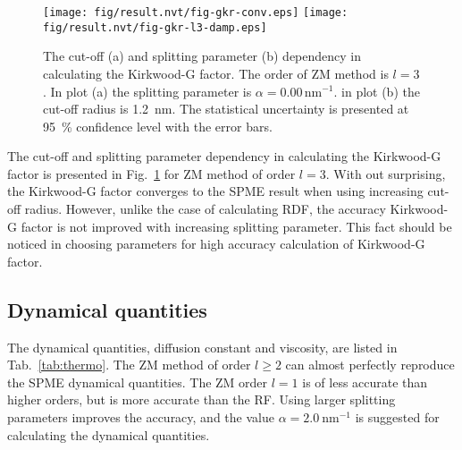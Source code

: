 \documentclass[aip,jcp,a4paper,preprint,unsortedaddress,onecolumn,fleqn]{revtex4-1}
\begin{document}
\begin{figure}
  \centering
  \texttt{[image: fig/result.nvt/fig-gkr-conv.eps]}
  \texttt{[image: fig/result.nvt/fig-gkr-l3-damp.eps]} 
  \caption{
    The cut-off (a) and splitting parameter (b) dependency in calculating the Kirkwood-G factor.
    The order of ZM method is $l=3$. In plot (a) the splitting parameter is $\alpha = 0.00\,\textrm{nm}^{-1}$.
    in plot (b) the cut-off radius is 1.2~nm.
    The statistical uncertainty is presented at 95~\% confidence level with the  error bars.
  }
  \label{fig:gkr-conv}
\end{figure}

The cut-off and splitting parameter dependency in calculating the Kirkwood-G factor
is presented in Fig.~\ref{fig:gkr-conv}  for ZM method of order $l=3$. With out surprising,
the Kirkwood-G factor converges to the SPME result when using increasing cut-off radius. 
However, unlike the case of calculating RDF, the accuracy Kirkwood-G factor is not improved
with increasing splitting parameter. This fact should be noticed in choosing parameters for
high accuracy calculation of Kirkwood-G factor.

\subsection{Dynamical quantities}

The dynamical quantities, diffusion constant and viscosity, are listed in Tab.~\ref{tab:thermo}.
The ZM method of order $l\geq 2$ can almost perfectly reproduce the SPME dynamical quantities.
The ZM order $l=1$ is of less accurate than higher orders, but is more accurate than the RF.
Using larger splitting parameters improves the accuracy, and the value $\alpha= 2.0\ \textrm{nm}^{-1}$ is
suggested for calculating the dynamical quantities.


\end{document}
